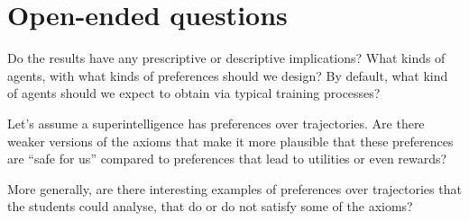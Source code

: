 \documentclass[11pt]{article}
\begin{document}
\section*{Open-ended questions}

\begin{exercise}
\label{ex:open-implications}
Do the results have any prescriptive or descriptive implications? What kinds of agents, with what kinds of preferences should we design? By default, what kind of agents should we expect to obtain via typical training processes?
\end{exercise}

\begin{exercise}
\label{ex:open-weaker-axioms}
Let's assume a superintelligence has preferences over trajectories. Are there weaker versions of the axioms that make it more plausible that these preferences are ``safe for us'' compared to preferences that lead to utilities or even rewards?
\end{exercise}

\begin{exercise}
\label{ex:open-examples}
More generally, are there interesting examples of preferences over trajectories that the students could analyse, that do or do not satisfy some of the axioms?
\end{exercise}


\begin{pdfonly}
\end{pdfonly}
\end{document}
